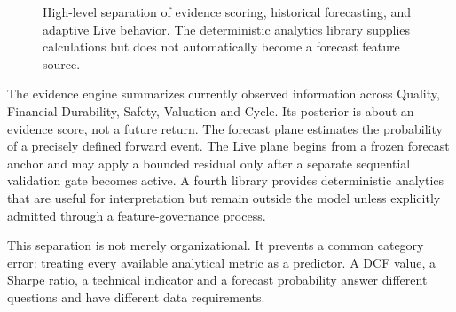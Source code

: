 \documentclass[11pt]{article}
\begin{document}
\begin{figure}[ht]
\centering
{}
\caption{High-level separation of evidence scoring, historical forecasting, and adaptive Live behavior. The deterministic analytics library supplies calculations but does not automatically become a forecast feature source.}
\end{figure}

The evidence engine summarizes currently observed information across Quality, Financial Durability, Safety, Valuation and Cycle. Its posterior is about an evidence score, not a future return. The forecast plane estimates the probability of a precisely defined forward event. The Live plane begins from a frozen forecast anchor and may apply a bounded residual only after a separate sequential validation gate becomes active. A fourth library provides deterministic analytics that are useful for interpretation but remain outside the model unless explicitly admitted through a feature-governance process.

This separation is not merely organizational. It prevents a common category error: treating every available analytical metric as a predictor. A DCF value, a Sharpe ratio, a technical indicator and a forecast probability answer different questions and have different data requirements.
\end{document}
